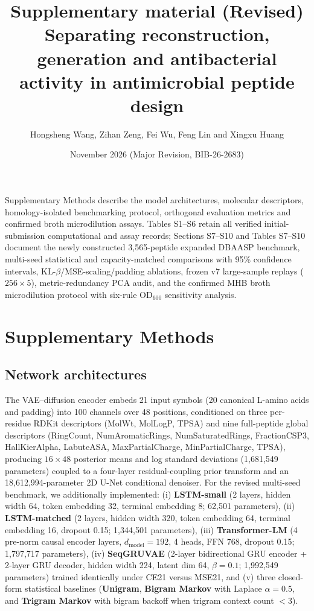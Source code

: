 \documentclass[11pt,a4paper]{article}
\title{Supplementary material (Revised)\\[5pt]\large Separating reconstruction, generation and antibacterial activity in antimicrobial peptide design}
\author{Hongsheng Wang, Zihan Zeng, Fei Wu, Feng Lin and Xingxu Huang}
\date{November 2026 (Major Revision, BIB-26-2683)}
\newcommand{\rev}[1]{#1}
\begin{document}
\maketitle\thispagestyle{fancy}
Supplementary Methods describe the model architectures, molecular descriptors, homology-isolated benchmarking protocol, orthogonal evaluation metrics and confirmed broth microdilution assays. Tables S1--S6 retain all verified initial-submission computational and assay records; \rev{Sections S7--S10 and Tables S7--S10 document the newly constructed 3,565-peptide expanded DBAASP benchmark, multi-seed statistical and capacity-matched comparisons with 95\% confidence intervals, KL-$\beta$/MSE-scaling/padding ablations, frozen v7 large-sample replays ($256\times 5$), metric-redundancy PCA audit, and the confirmed MHB broth microdilution protocol with six-rule OD$_{600}$ sensitivity analysis.}

\section*{Supplementary Methods}
\subsection*{Network architectures}
The VAE--diffusion encoder embeds 21 input symbols (20 canonical L-amino acids and padding) into 100 channels over 48 positions, conditioned on three per-residue RDKit descriptors (MolWt, MolLogP, TPSA) and nine full-peptide global descriptors (RingCount, NumAromaticRings, NumSaturatedRings, FractionCSP3, HallKierAlpha, LabuteASA, MaxPartialCharge, MinPartialCharge, TPSA), producing $16\times 48$ posterior means and log standard deviations (1,681,549 parameters) coupled to a four-layer residual-coupling prior transform and an 18,612,994-parameter 2D U-Net conditional denoiser. \rev{For the revised multi-seed benchmark, we additionally implemented: (i) \textbf{LSTM-small} (2 layers, hidden width 64, token embedding 32, terminal embedding 8; 62,501 parameters), (ii) \textbf{LSTM-matched} (2 layers, hidden width 320, token embedding 64, terminal embedding 16, dropout 0.15; 1,344,501 parameters), (iii) \textbf{Transformer-LM} (4 pre-norm causal encoder layers, $d_{\mathrm{model}}=192$, 4 heads, FFN 768, dropout 0.15; 1,797,717 parameters), (iv) \textbf{SeqGRUVAE} (2-layer bidirectional GRU encoder + 2-layer GRU decoder, hidden width 224, latent dim 64, $\beta=0.1$; 1,992,549 parameters) trained identically under CE21 versus MSE21, and (v) three closed-form statistical baselines (\textbf{Unigram}, \textbf{Bigram Markov} with Laplace $\alpha=0.5$, and \textbf{Trigram Markov} with bigram backoff when trigram context count $<3$).}
\end{document}
